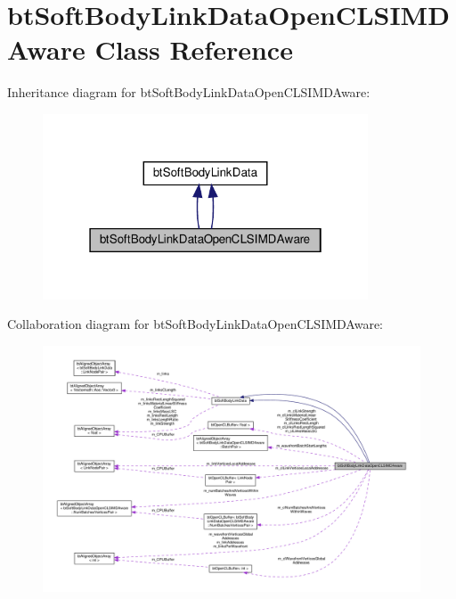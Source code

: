 \hypertarget{classbtSoftBodyLinkDataOpenCLSIMDAware}{}\section{bt\+Soft\+Body\+Link\+Data\+Open\+C\+L\+S\+I\+M\+D\+Aware Class Reference}
\label{classbtSoftBodyLinkDataOpenCLSIMDAware}


Inheritance diagram for bt\+Soft\+Body\+Link\+Data\+Open\+C\+L\+S\+I\+M\+D\+Aware\+:
\nopagebreak
\begin{figure}[H]
\begin{center}
\leavevmode
\includegraphics[width=274pt]{classbtSoftBodyLinkDataOpenCLSIMDAware__inherit__graph}
\end{center}
\end{figure}


Collaboration diagram for bt\+Soft\+Body\+Link\+Data\+Open\+C\+L\+S\+I\+M\+D\+Aware\+:
\nopagebreak
\begin{figure}[H]
\begin{center}
\leavevmode
\includegraphics[width=350pt]{classbtSoftBodyLinkDataOpenCLSIMDAware__coll__graph}
\end{center}
\end{figure}
